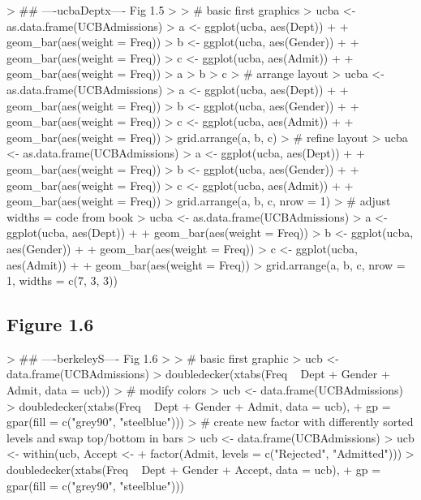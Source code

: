 \documentclass[12pt,letterpaper,final]{article}
\begin{document}
\begin{Schunk}
\begin{Sinput}
> ## ----ucbaDeptx---- Fig 1.5
> 
> # basic first graphics
> ucba <- as.data.frame(UCBAdmissions)
> a <- ggplot(ucba, aes(Dept)) + 
+   geom_bar(aes(weight = Freq))
> b <- ggplot(ucba, aes(Gender)) + 
+   geom_bar(aes(weight = Freq))
> c <- ggplot(ucba, aes(Admit)) + 
+   geom_bar(aes(weight = Freq))
> a
> b
> c
> # arrange layout
> ucba <- as.data.frame(UCBAdmissions)
> a <- ggplot(ucba, aes(Dept)) + 
+   geom_bar(aes(weight = Freq))
> b <- ggplot(ucba, aes(Gender)) + 
+   geom_bar(aes(weight = Freq))
> c <- ggplot(ucba, aes(Admit)) + 
+   geom_bar(aes(weight = Freq))
> grid.arrange(a, b, c)
> # refine layout
> ucba <- as.data.frame(UCBAdmissions)
> a <- ggplot(ucba, aes(Dept)) + 
+   geom_bar(aes(weight = Freq))
> b <- ggplot(ucba, aes(Gender)) + 
+   geom_bar(aes(weight = Freq))
> c <- ggplot(ucba, aes(Admit)) + 
+   geom_bar(aes(weight = Freq))
> grid.arrange(a, b, c, nrow = 1)
> # adjust widths = code from book
> ucba <- as.data.frame(UCBAdmissions)
> a <- ggplot(ucba, aes(Dept)) + 
+   geom_bar(aes(weight = Freq))
> b <- ggplot(ucba, aes(Gender)) + 
+   geom_bar(aes(weight = Freq))
> c <- ggplot(ucba, aes(Admit)) + 
+   geom_bar(aes(weight = Freq))
> grid.arrange(a, b, c, nrow = 1, widths = c(7, 3, 3))
\end{Sinput}
\end{Schunk}


\subsection{Figure 1.6}


\begin{Schunk}
\begin{Sinput}
> ## ----berkeleyS---- Fig 1.6
> 
> # basic first graphic
> ucb <- data.frame(UCBAdmissions)
> doubledecker(xtabs(Freq ~ Dept + Gender + Admit, data = ucb))
> # modify colors
> ucb <- data.frame(UCBAdmissions)
> doubledecker(xtabs(Freq ~ Dept + Gender + Admit, data = ucb),
+              gp = gpar(fill = c("grey90", "steelblue")))
> # create new factor with differently sorted levels and swap top/bottom in bars
> ucb <- data.frame(UCBAdmissions)
> ucb <- within(ucb, Accept <- 
+                 factor(Admit, levels = c("Rejected", "Admitted")))
> doubledecker(xtabs(Freq ~ Dept + Gender + Accept, data = ucb),
+              gp = gpar(fill = c("grey90", "steelblue")))
\end{Sinput}
\end{Schunk}
\end{document}
